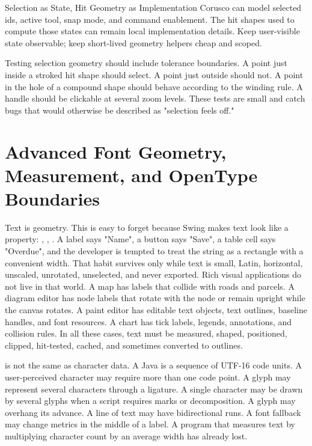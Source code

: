 \begin{coruscobox}{Selection as State, Hit Geometry as Implementation}
Corusco can model selected ids, active tool, snap mode, and command enablement. The hit shapes used to compute those states can remain local  implementation details. Keep user-visible state observable; keep short-lived geometry helpers cheap and scoped.
\end{coruscobox}

Testing selection geometry should include tolerance boundaries. A point just inside a stroked hit shape should select. A point just outside should not. A point in the hole of a compound shape should behave according to the winding rule. A handle should be clickable at several zoom levels. These tests are small and catch bugs that would otherwise be described as "selection feels off."

\section{Advanced Font Geometry, Measurement, and OpenType Boundaries}

Text is geometry. This is easy to forget because Swing makes text look like a property: , , . A label says "Name", a button says "Save", a table cell says "Overdue", and the developer is tempted to treat the string as a rectangle with a convenient width. That habit survives only while text is small, Latin, horizontal, unscaled, unrotated, unselected, and never exported. Rich visual applications do not live in that world. A map has labels that collide with roads and parcels. A diagram editor has node labels that rotate with the node or remain upright while the canvas rotates. A paint editor has editable text objects, text outlines, baseline handles, and font resources. A chart has tick labels, legends, annotations, and collision rules. In all these cases, text must be measured, shaped, positioned, clipped, hit-tested, cached, and sometimes converted to outlines.

 is not the same as character data. A Java  is a sequence of UTF-16 code units. A user-perceived character may require more than one code point. A glyph may represent several characters through a ligature. A single character may be drawn by several glyphs when a script requires marks or decomposition. A glyph may overhang its advance. A line of text may have bidirectional runs. A font fallback may change metrics in the middle of a label. A program that measures text by multiplying character count by an average width has already lost.

